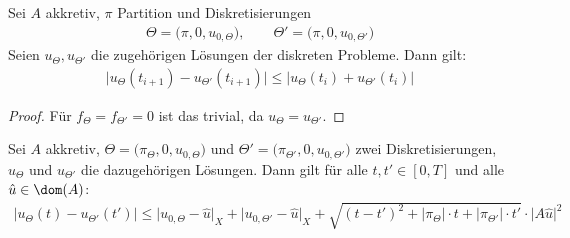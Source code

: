 \begin{lemma}
Sei $A$ akkretiv, $\pi$ Partition und Diskretisierungen 
\begin{align*}
\Theta=\big(\pi,0,u_{0,\Theta}\big),\qquad
\Theta'=\big(\pi,0,u_{0,\Theta'}\big)
\end{align*}
Seien $u_\Theta,u_{\Theta'}$ die zugehörigen Lösungen der diskreten Probleme. Dann gilt:
\begin{align*}
\Big|u_\Theta(t_{i+1})-u_{\Theta'}(t_{i+1})\Big|\leq\Big| u_\Theta (t_i)+u_{\Theta'}(t_i)\Big|
\end{align*}
\end{lemma}
\begin{proof}
Für $f_\Theta=f_{\Theta'}=0$ ist das trivial, da $u_\Theta=u_{\Theta'}$.
\end{proof}

\begin{theorem}
Sei $A$ akkretiv, $\Theta=\big(\pi_\Theta,0,u_{0,\Theta}\big)$ und $\Theta'=\big(\pi_{\Theta'},0,u_{0,\Theta'}\big)$ zwei Diskretisierungen, $u_\Theta$ und $u_{\Theta'}$ die dazugehörigen Lösungen. Dann gilt für alle $t,t'\in[0,T]$ und alle $\hat{u}\in\dom(A)$:
\begin{align*}
\big| u_\Theta(t)-u_{\Theta'}(t')\big|
\leq\big|u_{0,\Theta}-\hat{u}\big|_X+\big| u_{0,\Theta'}-\hat{u}\big|_X+\sqrt{(t-t')^2+|\pi_\Theta|\cdot t+|\pi_{\Theta'}|\cdot t'}\cdot|A\hat{u}\big|^2
\end{align*}
\end{theorem}
